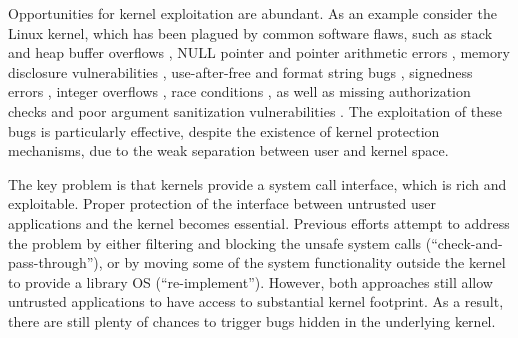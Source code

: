 \par
Opportunities for kernel exploitation are abundant. As an example consider the Linux kernel, which has been plagued by common software flaws, such as stack and heap buffer overflows \cite{CVE:20093234, CVE:20131828, CVE:20132892}, NULL pointer and pointer arithmetic errors \cite{CVE:20050736, CVE:20092698}, memory disclosure vulnerabilities \cite{CVE:20093002, CVE:20104073}, use-after-free and format string bugs \cite{CVE:20132852, CVE:20134343}, signedness errors \cite{CVE:20103437, CVE:20132094}, integer overflows \cite{CVE:20050736, CVE:20102959}, race conditions \cite{CVE:20091527, CVE:20093547}, as well as missing authorization checks and poor argument sanitization vulnerabilities \cite{CVE:20103904, CVE:20104347, CVE:20120946, CVE:20130268}. The exploitation of these bugs is particularly effective, despite the existence of kernel protection mechanisms, due to the weak separation between user and kernel space.


\par
The key problem is that kernels provide a system call interface, which is rich and exploitable. Proper protection of the interface between untrusted user applications and the kernel becomes essential. Previous efforts attempt to address the problem by either filtering and blocking the unsafe system calls (``check-and-pass-through''), or by moving some of the system functionality outside the kernel to provide a library OS \cite{Drawbridge:11} (``re-implement''). However, both approaches still allow untrusted applications to have access to substantial kernel footprint. As a result, there are still plenty of chances to trigger bugs hidden in the underlying kernel. 




